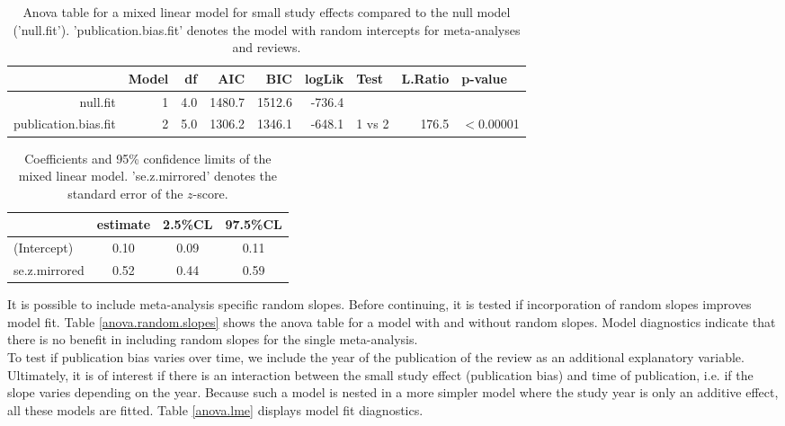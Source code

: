 \documentclass[11pt,a4paper,twoside]{book}\usepackage[]{graphicx}\usepackage[]{color}
\begin{document}


\begin{table}[ht]
\centering
\begingroup\scriptsize
\begin{tabular}{rrrrrrlrl}
  \hline
 & Model & df & AIC & BIC & logLik & Test & L.Ratio & p-value \\ 
  \hline
null.fit &  1 & 4.0 & 1480.7 & 1512.6 & -736.4 &  &  &  \\ 
  publication.bias.fit &  2 & 5.0 & 1306.2 & 1346.1 & -648.1 & 1 vs 2 & 176.5 & $<$0.00001 \\ 
   \hline
\end{tabular}
\endgroup
\caption{Anova table for a mixed linear model for small study effects compared to the null model ('null.fit'). 'publication.bias.fit' denotes the model with random intercepts for meta-analyses and reviews.} 
\label{anova.small.study}
\end{table}


\begin{table}[ht]
\centering
\begingroup\scriptsize
\begin{tabular}{lccc}
  \hline
 & estimate & 2.5\%CL & 97.5\%CL \\ 
  \hline
(Intercept) & 0.10 & 0.09 & 0.11 \\ 
  se.z.mirrored & 0.52 & 0.44 & 0.59 \\ 
   \hline
\end{tabular}
\endgroup
\caption{Coefficients and 95\% confidence limits of the mixed linear model. 'se.z.mirrored' denotes the standard error of the $z$-score.} 
\label{coefficients.small.study}
\end{table}


It is possible to include meta-analysis specific random slopes. Before continuing, it is tested if incorporation of random slopes improves model fit. Table \ref{anova.random.slopes} shows the anova table for a model with and without random slopes. Model diagnostics indicate that there is no benefit in including random slopes for the single meta-analysis. \\
To test if publication bias varies over time, we include the year of the publication of the review as an additional explanatory variable. Ultimately, it is of interest if there is an interaction between the small study effect (publication bias) and time of publication, i.e. if the slope varies depending on the year. Because such a model is nested in a more simpler model where the study year is only an additive effect, all these models are fitted. Table \ref{anova.lme} displays model fit diagnostics.
\end{document}
